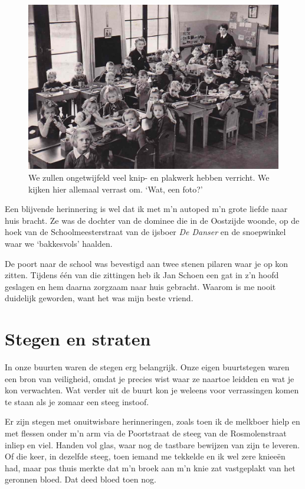 \documentclass[10pt,twoside, openright]{memoir}
\begin{document}
\begin{figure}
\includegraphics[width=\textwidth]{img/ch6/kleuterschool2}
\caption*{\footnotesize We zullen ongetwijfeld veel knip- en plakwerk hebben verricht. We kijken hier allemaal verrast om. `Wat, een foto?'}
\end{figure}

Een blijvende herinnering is wel dat ik met m’n autoped m’n grote liefde naar huis bracht. Ze was de dochter van de dominee die in de Oostzijde woonde, op de hoek van de Schoolmeesterstraat van de ijsboer \emph{De Danser} en de snoepwinkel waar we `bakkesvols' haalden. 

De poort naar de school was bevestigd aan twee stenen pilaren waar je op kon zitten. Tijdens één van die zittingen heb ik Jan Schoen een gat in z’n hoofd geslagen en hem daarna zorgzaam naar huis gebracht. Waarom is me nooit duidelijk geworden, want het was mijn beste vriend. 



\chapter{Stegen en straten} %
\label{cha:stegen_straten}

In onze buurten waren de stegen erg belangrijk. Onze eigen buurtstegen waren een bron van veiligheid, omdat je precies wist waar ze naartoe leidden en wat je kon verwachten. Wat verder uit de buurt kon je weleens voor verrassingen komen te staan als je zomaar een steeg instoof. 

Er zijn stegen met onuitwisbare herinneringen, zoals toen ik de melkboer hielp en met flessen onder m’n arm via de Poortstraat de steeg van de Rosmolenstraat inliep en viel. Handen vol glas, waar nog de tastbare bewijzen van zijn te leveren. Of die keer, in dezelfde steeg, toen iemand me tekkelde en ik wel zere knieeën had, maar pas thuis merkte dat m’n broek aan m’n knie zat vastgeplakt van het geronnen bloed. Dat deed bloed toen nog.
\end{document}
